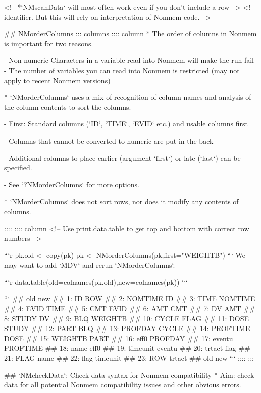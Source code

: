 <!-- *`NMscanData` will most often work even if you don't include a row -->
<!-- identifier. But this will rely on interpretation of Nonmem code. -->

## NMorderColumns
::: columns
:::: column
\vspace{12pt}
* The order of columns in Nonmem is important for two reasons. 

- Non-numeric Characters in a variable read into Nonmem will make the run
fail
- The number of
variables you can read into Nonmem is restricted (may not apply to recent Nonmem versions)

* `NMorderColumns` uses a mix of recognition of column names and analysis of the
column contents to sort the columns. 

- First: Standard columns (`ID`, `TIME`, `EVID` etc.) and usable columns first

- Columns that cannot be converted to numeric are put in the back

- Additional columns to place earlier (argument `first`) or late (`last`) can be specified. 

- See `?NMorderColumns` for more options.

* `NMorderColumns` does not sort rows, nor does it modify any contents of columns.

::::
:::: column
<!-- Use print.data.table to get top and bottom with correct row numbers -->
\footnotesize

```r
pk.old <- copy(pk)
pk <- NMorderColumns(pk,first="WEIGHTB")
```
\normalsize
We may want to add `MDV` and rerun `NMorderColumns`.
\footnotesize

```r
data.table(old=colnames(pk.old),new=colnames(pk))
```

```
##          old      new
##  1:       ID      ROW
##  2:  NOMTIME       ID
##  3:     TIME  NOMTIME
##  4:     EVID     TIME
##  5:      CMT     EVID
##  6:      AMT      CMT
##  7:       DV      AMT
##  8:    STUDY       DV
##  9:      BLQ  WEIGHTB
## 10:    CYCLE     FLAG
## 11:     DOSE    STUDY
## 12:     PART      BLQ
## 13:  PROFDAY    CYCLE
## 14: PROFTIME     DOSE
## 15:  WEIGHTB     PART
## 16:     eff0  PROFDAY
## 17:   eventu PROFTIME
## 18:     name     eff0
## 19: timeunit   eventu
## 20:   trtact     flag
## 21:     FLAG     name
## 22:     flag timeunit
## 23:      ROW   trtact
##          old      new
```
::::
\normalsize
:::


## `NMcheckData`: Check data syntax for Nonmem compatibility 
* Aim: check data for all potential Nonmem compatibility issues and other obvious errors.

